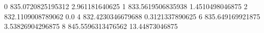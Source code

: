 0 835.0720825195312 2.961181640625
1 833.5619506835938 1.4510498046875
2 832.1109008789062 0.0
4 832.4230346679688 0.3121337890625
6 835.649169921875 3.53826904296875
8 845.5596313476562 13.44873046875
